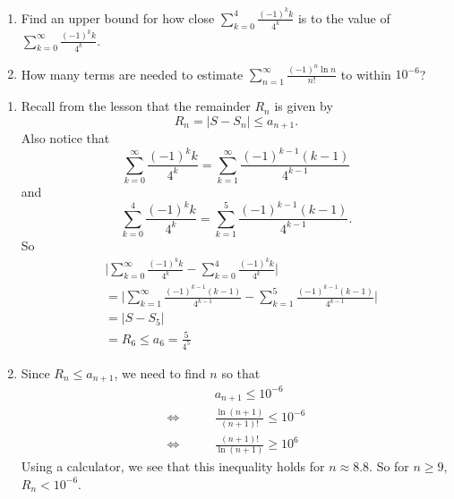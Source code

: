 \documentclass[]{ximera}
\begin{document}
\begin{problem}
\begin{enumerate}

\item  Find an upper bound for how close $\sum_{k=0}^4 \frac{(-1)^k k}{4^k}$ is to the value of $\sum_{k=0}^\infty \frac{(-1)^k k}{4^k}$.

\item  How many terms are needed to estimate $\sum_{n=1}^\infty \frac{(-1)^n \ln n}{n!}$ to within $10^{-6}$?

\end{enumerate}
	\begin{freeResponse}
	\begin{enumerate}

	\item  Recall from the lesson that the remainder $R_n$ is given by
		\[
		R_n = |S - S_n| \leq a_{n+1}.
		\]
	Also notice that
		\[
		\sum_{k=0}^\infty \frac{(-1)^k k}{4^k} = \sum_{k=1}^\infty \frac{(-1)^{k-1} (k-1)}{4^{k-1}}
		\]
	and
		\[
		\sum_{k=0}^4 \frac{(-1)^k k}{4^k} = \sum_{k=1}^5 \frac{(-1)^{k-1} (k-1)}{4^{k-1}}.
		\]
	So
		\begin{align*}
		&\biggr| \sum_{k=0}^\infty \frac{(-1)^k k}{4^k} - \sum_{k=0}^4 \frac{(-1)^k k}{4^k} \biggr|  \\
		&= \biggr| \sum_{k=1}^\infty \frac{(-1)^{k-1} (k-1)}{4^{k-1}} - \sum_{k=1}^5 \frac{(-1)^{k-1} (k-1)}{4^{k-1}} \biggr|  \\
		&= | S - S_5 |  \\
		&= R_6 \leq a_6 = \boxed{\frac{5}{4^5}}
		\end{align*}

	\item  Since $R_n \leq a_{n+1}$, we need to find $n$ so that 
		\begin{align*}
		&a_{n+1} \leq 10^{-6}  \\
		\Longleftrightarrow 	\qquad	&\frac{\ln (n+1)}{(n+1)!} \leq 10^{-6}  \\
		\Longleftrightarrow 	\qquad	&\frac{(n+1)!}{\ln (n+1)} \geq 10^6 
		\end{align*}
	Using a calculator, we see that this inequality holds for $n \approx 8.8$.  
	So for $\boxed{n \geq 9}$, $R_n < 10^{-6}$.  

	\end{enumerate}
	\end{freeResponse}
		
\end{problem}
\end{document}
